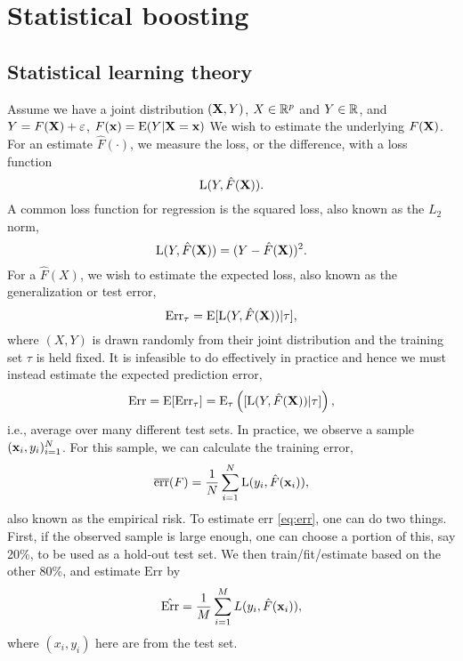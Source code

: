\chapter{Statistical boosting}

\section{Statistical learning theory}\label{sec:learning-theory}
Assume we have a joint distribution $(\mathbf{X}, Y)$, $X\in\mathbb{R}^p$ and $Y\in\mathbb{R}$, and $Y=F(\mathbf{X})+\varepsilon$, $F(\mathbf{x})=\operatorname{E}(Y|\mathbf{X}=\mathbf{x})$ We wish to estimate the underlying $F(\mathbf{X})$. For an estimate $\hat{F}(\cdot)$, we measure the loss, or the difference, with a loss function
\begin{equation*}
    \operatorname{L}(Y, \hat{F}(\mathbf{X})).
\end{equation*}
A common loss function for regression is the squared loss, also known as the $L_2$ norm,
\begin{equation*}
    \operatorname{L}(Y, \hat{F}(\mathbf{X}))=(Y-\hat{F}(\mathbf{X}))^2.
\end{equation*}
For a $\hat{F}(X)$, we wish to estimate the expected loss, also known as the generalization or test error,
\begin{equation*}
    \text{Err}_{\tau}=\operatorname{E}[\operatorname{L}(Y,\hat{F}(\mathbf{X}))|\tau],
\end{equation*}
where $(X,Y)$ is drawn randomly from their joint distribution and the training set $\tau$ is held fixed. It is infeasible to do effectively in practice %
and hence we must instead estimate the expected prediction error,
\begin{equation}\label{eq:err}
    \text{Err}=\operatorname{E}[\text{Err}_\tau]=\operatorname{E}_\tau\left([\operatorname{L}(Y,\hat{F}(\mathbf{X}))|\tau]\right),
\end{equation}
i.e., average over many different test sets.
In practice, we observe a sample $(\mathbf{x}_i,y_i)_{i=1}^N$. For this sample, we can calculate the training error,
\begin{equation}\label{eq:empirical-risk}
    \overline{\text{err}}(F)=\frac{1}{N}\sum_{i=1}^N\operatorname{L}(y_i, \hat{F}(\mathbf{x}_i)),
\end{equation}
also known as the empirical risk. To estimate $\text{err}$ \eqref{eq:err}, one can do two things. First, if the observed sample is large enough, one can choose a portion of this, say 20\%, to be used as a hold-out test set. We then train/fit/estimate based on the other 80\%, and estimate $\text{Err}$ by
\begin{equation*}
    \hat{\text{Err}}=\frac{1}{M}\sum_{i=1}^ML(y_i,\hat{F}(\mathbf{x}_i)),
\end{equation*}
where $(x_i,y_i)$ here are from the test set.

